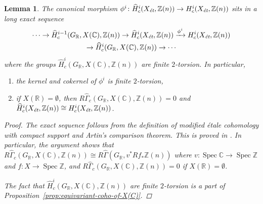 \documentclass[leqno,12pt]{article}
\theoremstyle{plain}
\newtheorem{lemma}[theorem]{\indent\sc Lemma}
\theoremstyle{definition}
\DeclareMathOperator{\Spec}{Spec}
\newcommand{\CC}{\mathbb{C}}
\newcommand{\RR}{\mathbb{R}}
\newcommand{\ZZ}{\mathbb{Z}}
\newcommand{\et}{\text{\it \'{e}t}}
\begin{document}
\begin{lemma}
  \label{lemma:morphism-hat-Hc(Xet,Z(n))->Hc(Xet,Z(n))}
  The canonical morphism
  $\phi^i\colon \widehat{H}^i_c (X_\et, \ZZ (n)) \to H^i_c (X_\et, \ZZ (n))$
  sits in a long exact sequence
  \begin{multline*}
    \cdots \to \widehat{H}^{i-1}_c (G_\RR, X (\CC), \ZZ (n)) \to
    \widehat{H}_c^i (X_\et, \ZZ(n)) \xrightarrow{\phi^i}
    H_c^i (X_\et, \ZZ(n)) \\
    \to \widehat{H}^i_c (G_\RR, X (\CC), \ZZ (n)) \to \cdots
  \end{multline*}
  where the groups $\widehat{H}^i_c (G_\RR, X (\CC), \ZZ
  (n))$ are finite $2$-torsion. In particular,
  \begin{enumerate}
  \item[$1)$] the kernel and cokernel of $\phi^i$ is finite $2$-torsion,

  \item[$2)$] if $X (\RR) = \emptyset$, then
    $R\widehat{\Gamma}_c (G_\RR, X (\CC), \ZZ (n)) = 0$ and
    $\widehat{H}^i_c (X_\et, \ZZ (n)) \cong H^i_c (X_\et, \ZZ (n))$.
  \end{enumerate}

  \begin{proof}
    The exact sequence follows from the definition of modified \'{e}tale cohomology
    with compact support and Artin's comparison theorem. This is proved in
    \cite[Lemma~6.14]{Flach-Morin-2018}. In particular, the argument shows that
    $R\widehat{\Gamma}_c (G_\RR, X (\CC), \ZZ (n)) \cong
    R\widehat{\Gamma} (G_\RR, v^* Rf_* \ZZ(n))$ where
    $v\colon \Spec \CC \to \Spec \ZZ$ and $f\colon X\to \Spec \ZZ$,
    and $R\widehat{\Gamma}_c (G_\RR, X (\CC), \ZZ (n)) = 0$ if
    $X (\RR) = \emptyset$.

    The fact that $\widehat{H}^i_c (G_\RR, X (\CC), \ZZ (n))$ are finite
    $2$-torsion is a part of Proposition~\ref{prop:equivariant-coho-of-X(C)}.
  \end{proof}
\end{lemma}
\end{document}

